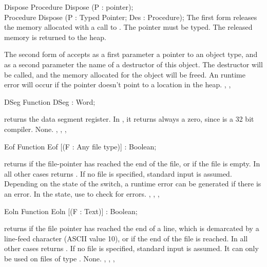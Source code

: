 
\begin{procedure}{Dispose}
\Declaration
Procedure Dispose (P : pointer);\\
Procedure Dispose (P : Typed Pointer; Des : Procedure);
\Description
The first form  releases the memory allocated with a call to
. The pointer  must be typed. The released memory is
returned to the heap.

The second form of  accepts as a first parameter a pointer
to an object type, and as a second parameter the name of a destructor
of this object. The destructor will be called, and the memory allocated
for the object will be freed.
\Errors
An runtime error will occur if the pointer doesn't point to a location in the
heap.
\SeeAlso
{}, , 
\end{procedure}


\begin{function}{DSeg}
\Declaration
Function DSeg  : Word;

\Description
{} returns the data segment register. In \fpc, it returns always a
zero, since \fpc is a 32 bit compiler.
\Errors
None.
\SeeAlso
{}, , , 
\end{function}


\begin{function}{Eof}
\Declaration
Function Eof [(F : Any file type)] : Boolean;

\Description
{} returns  if the file-pointer has reached the end of the
file, or if the file is empty. In all other cases  returns
.
If no file  is specified, standard input is assumed.
\Errors
Depending on the state of the  switch, a runtime error can be 
generated if there is an error. In the  state, use 
to check for errors.
\SeeAlso
{}, , , 
\end{function}


\begin{function}{Eoln}
\Declaration
Function Eoln [(F : Text)] : Boolean;

\Description
{} returns  if the file pointer has reached the end of a
line, which is demarcated by a line-feed character (ASCII value 10), or if
the end of the file is reached.
In all other cases  returns .
If no file  is specified, standard input is assumed.
It can only be used on files of type .
\Errors
None.
\SeeAlso
{}, , , 
\end{function}

